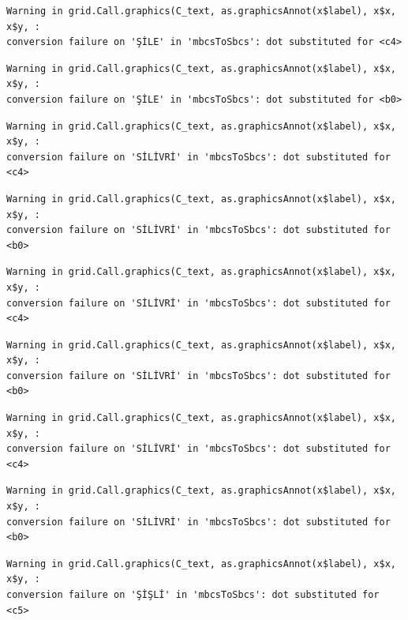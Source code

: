 \documentclass[
  11pt,
  a4paper,
  DIV=11,
  numbers=noendperiod]{scrartcl}
\begin{document}
\begin{verbatim}
Warning in grid.Call.graphics(C_text, as.graphicsAnnot(x$label), x$x, x$y, :
conversion failure on 'ŞİLE' in 'mbcsToSbcs': dot substituted for <c4>
\end{verbatim}

\begin{verbatim}
Warning in grid.Call.graphics(C_text, as.graphicsAnnot(x$label), x$x, x$y, :
conversion failure on 'ŞİLE' in 'mbcsToSbcs': dot substituted for <b0>
\end{verbatim}

\begin{verbatim}
Warning in grid.Call.graphics(C_text, as.graphicsAnnot(x$label), x$x, x$y, :
conversion failure on 'SİLİVRİ' in 'mbcsToSbcs': dot substituted for <c4>
\end{verbatim}

\begin{verbatim}
Warning in grid.Call.graphics(C_text, as.graphicsAnnot(x$label), x$x, x$y, :
conversion failure on 'SİLİVRİ' in 'mbcsToSbcs': dot substituted for <b0>
\end{verbatim}

\begin{verbatim}
Warning in grid.Call.graphics(C_text, as.graphicsAnnot(x$label), x$x, x$y, :
conversion failure on 'SİLİVRİ' in 'mbcsToSbcs': dot substituted for <c4>
\end{verbatim}

\begin{verbatim}
Warning in grid.Call.graphics(C_text, as.graphicsAnnot(x$label), x$x, x$y, :
conversion failure on 'SİLİVRİ' in 'mbcsToSbcs': dot substituted for <b0>
\end{verbatim}

\begin{verbatim}
Warning in grid.Call.graphics(C_text, as.graphicsAnnot(x$label), x$x, x$y, :
conversion failure on 'SİLİVRİ' in 'mbcsToSbcs': dot substituted for <c4>
\end{verbatim}

\begin{verbatim}
Warning in grid.Call.graphics(C_text, as.graphicsAnnot(x$label), x$x, x$y, :
conversion failure on 'SİLİVRİ' in 'mbcsToSbcs': dot substituted for <b0>
\end{verbatim}

\begin{verbatim}
Warning in grid.Call.graphics(C_text, as.graphicsAnnot(x$label), x$x, x$y, :
conversion failure on 'ŞİŞLİ' in 'mbcsToSbcs': dot substituted for <c5>
\end{verbatim}
\end{document}

